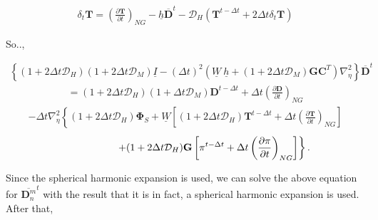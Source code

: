 \begin{eqnarray}
  \delta_{t} {\mathbf{T}} =
        \left( \frac{\partial {\mathbf{T}}}{\partial t} \right)_{NG}  
         - \underline{h} \overline{ {\mathbf{D}} }^{t} 
         - {\mathcal D}_H ( {\mathbf{T}}^{t-\Delta t}
                        + 2 \Delta t \delta_{t} {\mathbf{T}} )
\end{eqnarray}

So..,

\begin{eqnarray}
      \left\{ ( 1+2\Delta t {\mathcal D}_H )( 1+2\Delta t {\mathcal D}_M )
           \underline{I}  
      - ( \Delta t )^{2}  ( \underline{W} \ \underline{h} 
           + (1+2\Delta t {\mathcal D}_M)
             {\mathbf{G}} {\mathbf{C}}^{T} ) \nabla^{2}_{\eta}
  \right\}
      \overline{ {\mathbf{D}} }^{t} 
\end{eqnarray} \begin{eqnarray}
  = ( 1+2\Delta t {\mathcal D}_H )( 1+\Delta t {\mathcal D}_M ) 
       {\mathbf{D}}^{t-\Delta t}
  + \Delta t 
     \left( \frac{\partial {\mathbf{D}}}{\partial t} \right)_{NG}  
\end{eqnarray} \begin{eqnarray}
  -  \Delta t \nabla^{2}_{\eta}     
                   \left\{  ( 1+2\Delta t {\mathcal D}_H ) {\mathbf{\Phi}}_{S} 
                          + \underline{W} 
                            \left[ ( 1+2\Delta t {\mathcal D}_H ) 
                                    {\mathbf{T}}^{t-\Delta t}
                                  + \Delta t 
                                      \left( \frac{\partial {\mathbf{T}}}
                                                  {\partial t}     
                                      \right)_{NG} \right]
                   \right.
\end{eqnarray} \begin{eqnarray}
                 \left.  \hspace*{20mm} 
                          + ( 1+2\Delta t {\mathcal D}_H ) {\mathbf{G}} 
                            \left[ \pi^{t-\Delta t} 
                                  + \Delta t
                                     \left( \frac{\partial \pi}
                                                 {\partial t} 
                                     \right)_{NG}  \right]
                   \right\} . 
\end{eqnarray}

Since the spherical harmonic expansion is used, we can solve the above
equation for \(\overline{ {\mathbf{D}}_n^m }^{t}\) with the result that
it is in fact, a spherical harmonic expansion is used. After that,

